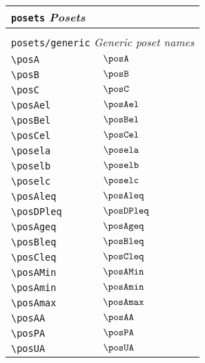 \begin{longtable}{lll}
 \multicolumn{3}{l}{{\color[rgb]{0.5,0.5,0.5}\texttt{posets}} \emph{Posets}}\\ 
 \hline
\hline
 &  & \\ 
 \multicolumn{3}{l}{{\color[rgb]{0.5,0.5,0.5}\texttt{posets/generic}} \emph{Generic poset names}}\\ 
 \hline
{\color[rgb]{0.5,0.5,0.5}\texttt{\textbackslash posA}} & $\posA$ & \\ 
 {\color[rgb]{0.5,0.5,0.5}\texttt{\textbackslash posB}} & $\posB$ & \\ 
 {\color[rgb]{0.5,0.5,0.5}\texttt{\textbackslash posC}} & $\posC$ & \\ 
 {\color[rgb]{0.5,0.5,0.5}\texttt{\textbackslash posAel}} & $\posAel$ & \\ 
 {\color[rgb]{0.5,0.5,0.5}\texttt{\textbackslash posBel}} & $\posBel$ & \\ 
 {\color[rgb]{0.5,0.5,0.5}\texttt{\textbackslash posCel}} & $\posCel$ & \\ 
 {\color[rgb]{0.5,0.5,0.5}\texttt{\textbackslash posela}} & $\posela$ & \\ 
 {\color[rgb]{0.5,0.5,0.5}\texttt{\textbackslash poselb}} & $\poselb$ & \\ 
 {\color[rgb]{0.5,0.5,0.5}\texttt{\textbackslash poselc}} & $\poselc$ & \\ 
 {\color[rgb]{0.5,0.5,0.5}\texttt{\textbackslash posAleq}} & $\posAleq$ & \\ 
 {\color[rgb]{0.5,0.5,0.5}\texttt{\textbackslash posDPleq}} & $\posDPleq$ & \\ 
 {\color[rgb]{0.5,0.5,0.5}\texttt{\textbackslash posAgeq}} & $\posAgeq$ & \\ 
 {\color[rgb]{0.5,0.5,0.5}\texttt{\textbackslash posBleq}} & $\posBleq$ & \\ 
 {\color[rgb]{0.5,0.5,0.5}\texttt{\textbackslash posCleq}} & $\posCleq$ & \\ 
 {\color[rgb]{0.5,0.5,0.5}\texttt{\textbackslash posAMin}} & $\posAMin$ & \\ 
 {\color[rgb]{0.5,0.5,0.5}\texttt{\textbackslash posAmin}} & $\posAmin$ & \\ 
 {\color[rgb]{0.5,0.5,0.5}\texttt{\textbackslash posAmax}} & $\posAmax$ & \\ 
 {\color[rgb]{0.5,0.5,0.5}\texttt{\textbackslash posAA}} & $\posAA$ & \\ 
 {\color[rgb]{0.5,0.5,0.5}\texttt{\textbackslash posPA}} & $\posPA$ & \\ 
 {\color[rgb]{0.5,0.5,0.5}\texttt{\textbackslash posUA}} & $\posUA$ & \\ 

\end{longtable}

